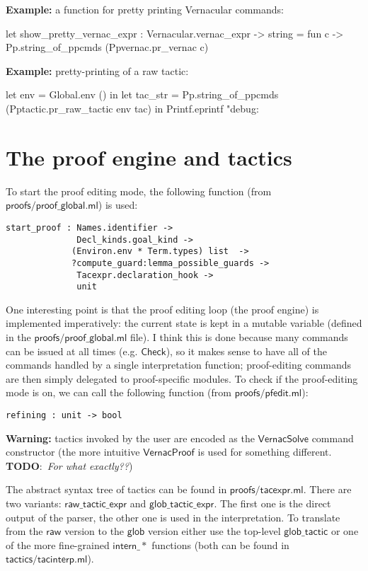 \documentclass[a4paper,oneside]{book}
\newcommand{\m}[1]{\ensuremath{\mathsf{#1}}}
\newcommand{\TODO}[1]{\textbf{TODO}:\ \emph{#1}}
\begin{document}
\noindent
\textbf{Example:} a function for pretty printing Vernacular commands:

\begin{code}
let show_pretty_vernac_expr : Vernacular.vernac_expr -> string = 
  fun c -> Pp.string_of_ppcmds (Ppvernac.pr_vernac c)
\end{code}

\noindent
\textbf{Example:} pretty-printing of a raw tactic:

\begin{code}
let env = Global.env () in
let tac_str = Pp.string_of_ppcmds (Pptactic.pr_raw_tactic env tac) in
Printf.eprintf "debug: %
\end{code}

\section{The proof engine and tactics}

To start the proof editing mode, the following function (from
\m{proofs/proof\_global.ml}) is used:
\begin{lstlisting}
start_proof : Names.identifier -> 
              Decl_kinds.goal_kind ->
             (Environ.env * Term.types) list  ->
             ?compute_guard:lemma_possible_guards -> 
              Tacexpr.declaration_hook -> 
              unit
\end{lstlisting}

One interesting point is that the proof editing loop (the proof
engine) is implemented imperatively: the current state is kept in a
mutable variable (defined in the \m{proofs/proof\_global.ml} file). I
think this is done because many commands can be issued at all times
(e.g. \m{Check}), so it makes sense to have all of the commands
handled by a single interpretation function; proof-editing commands
are then simply delegated to proof-specific modules. To check if the
proof-editing mode is on, we can call the following function (from
\m{proofs/pfedit.ml}):
\begin{lstlisting}
refining : unit -> bool
\end{lstlisting}
\textbf{Warning:} tactics invoked by the user are encoded as
the \m{VernacSolve} command constructor (the more intuitive
\m{VernacProof} is used for something different. \TODO{For what
  exactly??})

The abstract syntax tree of tactics can be found in
\m{proofs/tacexpr.ml}. There are two variants: \m{raw\_tactic\_expr}
and \m{glob\_tactic\_expr}. The first one is the direct output of the
parser, the other one is used in the interpretation. To translate from
the \m{raw} version to the \m{glob} version either use the top-level
\m{glob\_tactic} or one of the more fine-grained \m{intern\_*} functions
(both can be found in \m{tactics/tacinterp.ml}).
\end{document}
